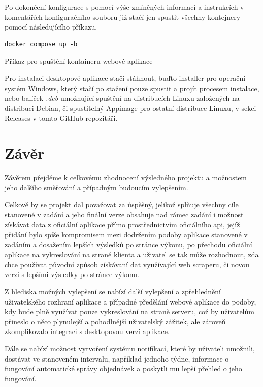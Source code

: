 \documentclass[12pt]{article}
\begin{document}
Po dokončení konfigurace s pomocí výše zmíněných informací a instrukcích v komentářích konfiguračního souboru již stačí jen spustit všechny kontejnery pomocí následujícího příkazu.

\begin{listing}[!ht]
\begin{verbatim}
docker compose up -b
\end{verbatim}
\caption{Příkaz pro spuštění kontaineru webové aplikace}
\end{listing}

Pro instalaci desktopové aplikace stačí stáhnout, buďto installer pro operační systém Windows, který stačí po stažení pouze spustit a projít procesem instalace, nebo balíček \textit{.deb} umožnující spuštění na distribucích Linuxu založených na distribuci Debian, či spustitelný Appimage pro ostatní distribuce Linuxu, v sekci Releases v tomto GitHub repozitáři.
\newpage
\section{Závěr}
Závěrem přejděme k celkovému zhodnocení výsledného projektu a možnostem jeho dalšího směřování a případným budoucím vylepšením.

Celkově by se projekt dal považovat za úspěšný, jelikož splňuje všechny cíle stanovené v zadání a jeho finální verze obsahuje nad rámec zadání i možnost získávat data z oficiální aplikace přímo prostřednictvím oficiálního api, jejíž přidání bylo spíše kompromisem mezi dodržením podoby aplikace stanovené v zadáním a dosažením lepších výsledků po stránce výkonu, po přechodu oficiální aplikace na vykreslování na straně klienta a uživatel se tak může rozhodnout, zda chce používat původní způsob získávaní dat využívající web scraperu, či novou verzi s lepšími výsledky po stránce výkonu.

Z hlediska možných vylepšení se nabízí další vylepšení a zpřehlednění uživatelského rozhraní aplikace a případné předělání webové aplikace do podoby, kdy bude plně využívat pouze vykreslování na straně serveru, což by uživatelům přineslo o něco plynulejší a pohodlnější uživatelský zážitek, ale zároveň zkomplikovalo integraci s desktopovou verzí aplikace.

Dále se nabízí možnost vytvoření systému notifikací, které by uživateli umožnili, dostávat ve stanoveném intervalu, například jednoho týdne, informace o fungování automatické správy objednávek a poskytli mu lepší přehled o jeho fungování.
\newpage
\printbibliography[heading=bibintoc,title={Reference}]
\newpage
{}
\listoflistings
\end{document}
